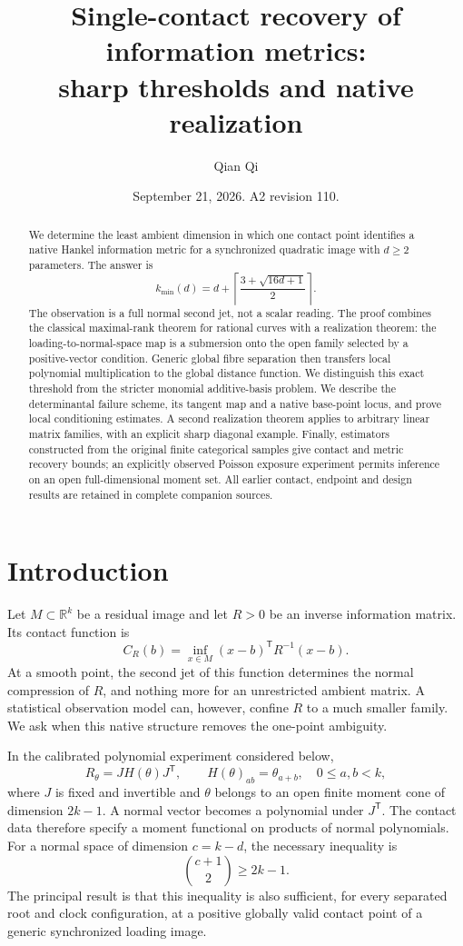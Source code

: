 \documentclass[11pt,reqno]{amsart}
\title[Sharp single-contact recovery]{Single-contact recovery of information metrics:\\sharp thresholds and native realization}
\author{Qian Qi}
\date{September 21, 2026. A2 revision 110.}
\numberwithin{equation}{section}
\theoremstyle{definition}\newtheorem{definition}[theorem]{Definition}
\theoremstyle{remark}\newtheorem{remark}[theorem]{Remark}
\newcommand{\R}{\mathbb R}
\begin{document}
\begin{abstract}
We determine the least ambient dimension in which one contact point identifies a native Hankel information metric for a synchronized quadratic image with $d\ge2$ parameters. The answer is
\[
 k_{\min}(d)=d+\left\lceil\frac{3+\sqrt{16d+1}}2\right\rceil.
\]
The observation is a full normal second jet, not a scalar reading. The proof combines the classical maximal-rank theorem for rational curves with a realization theorem: the loading-to-normal-space map is a submersion onto the open family selected by a positive-vector condition. Generic global fibre separation then transfers local polynomial multiplication to the global distance function. We distinguish this exact threshold from the stricter monomial additive-basis problem. We describe the determinantal failure scheme, its tangent map and a native base-point locus, and prove local conditioning estimates. A second realization theorem applies to arbitrary linear matrix families, with an explicit sharp diagonal example. Finally, estimators constructed from the original finite categorical samples give contact and metric recovery bounds; an explicitly observed Poisson exposure experiment permits inference on an open full-dimensional moment set. All earlier contact, endpoint and design results are retained in complete companion sources.
\end{abstract}
\maketitle

\section{Introduction}
Let $M\subset\R^k$ be a residual image and let $R>0$ be an inverse information matrix. Its contact function is
\begin{equation}\label{eq:distance}
 C_R(b)=\inf_{x\in M}(x-b)^{\mathsf T}R^{-1}(x-b).
\end{equation}
At a smooth point, the second jet of this function determines the normal compression of $R$, and nothing more for an unrestricted ambient matrix. A statistical observation model can, however, confine $R$ to a much smaller family. We ask when this native structure removes the one-point ambiguity.

In the calibrated polynomial experiment considered below,
\[
 R_\theta=JH(\theta)J^{\mathsf T},\qquad H(\theta)_{ab}=\theta_{a+b},
 \quad 0\le a,b<k,
\]
where $J$ is fixed and invertible and $\theta$ belongs to an open finite moment cone of dimension $2k-1$. A normal vector becomes a polynomial under $J^{\mathsf T}$. The contact data therefore specify a moment functional on products of normal polynomials. For a normal space of dimension $c=k-d$, the necessary inequality is
\begin{equation}\label{eq:dimension}
 \binom{c+1}{2}\ge 2k-1.
\end{equation}
The principal result is that this inequality is also sufficient, for every separated root and clock configuration, at a positive globally valid contact point of a generic synchronized loading image.
\end{document}
